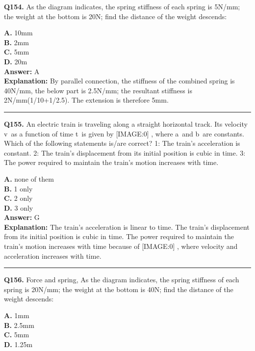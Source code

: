 \documentclass[12pt]{article}
\begin{document}
\noindent
\textbf{Q154.} As the diagram indicates, the spring stiffness of each spring is 5N/mm; the weight at the bottom is 20N; find the distance of the weight descends:



\textbf{A.} 10mm \\
\textbf{B.} 2mm \\
\textbf{C.} 5mm \\
\textbf{D.} 20m \\

\textbf{Answer:} A \\
\textbf{Explanation:} By parallel connection, the stiffness of the combined spring is 40N/mm, the below part is 2.5N/mm; the resultant stiffness is 2N/mm(1/10+1/2.5). The extension is therefore 5mm.

\hrule
\vspace{1em}


\noindent
\textbf{Q155.} An electric train is traveling along a straight horizontal track. Its velocity v as a function of time t is given by
[IMAGE:0]
, where a and b are constants. Which of the following statements is/are correct?
1: The train's acceleration is constant.
2: The train's displacement from its initial position is cubic in time.
3: The power required to maintain the train's motion increases with time.



\textbf{A.} none of them \\
\textbf{B.} 1 only \\
\textbf{C.} 2 only \\
\textbf{D.} 3 only \\

\textbf{Answer:} G \\
\textbf{Explanation:} The train's acceleration is linear to time. The train's displacement from its initial position is cubic in time. The power required to maintain the train's motion increases with time because of
[IMAGE:0]
, where velocity and acceleration increases with time.

\hrule
\vspace{1em}


\noindent
\textbf{Q156.} Force and spring,
As the diagram indicates, the spring stiffness of each spring is 20N/mm; the weight at the bottom is 40N; find the distance of the weight descends:



\textbf{A.} 1mm \\
\textbf{B.} 2.5mm \\
\textbf{C.} 5mm \\
\textbf{D.} 1.25m \\
\end{document}
